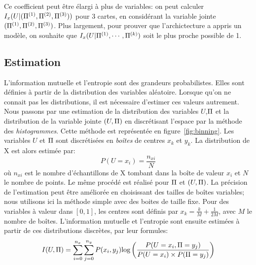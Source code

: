 
Ce coefficient peut être élargi à plus de variables: on peut calculer $I_x(U | (\Pi^{({1})},\Pi^{({2})},\Pi^{({3})}))$ pour 3 cartes, en considérant la variable jointe $(\Pi^{({1})},\Pi^{({2})},\Pi^{({3})})$.
Plus largement, pour prouver que l'archictecture a appris un modèle, on souhaite que $I_x(U|\Pi^{({1})},\cdots,\Pi^{({k})})$ soit le plus proche possible de 1.

\subsection{Estimation}

L'information mutuelle et l'entropie sont des grandeurs probabilistes. Elles sont définies à partir de la distribution des variables aléatoire. Lorsque qu'on ne connait pas les distributions, il est nécessaire d'estimer ces valeurs autrement. 
Nous passons par une estimation de la distribution des variables $U$,$\Pi$ et la distribution de la variable jointe $(U,\Pi)$ en discrétisant l'espace par la méthode des \emph{histogrammes}.
Cette méthode est représentée en figure~\ref{fig:binning}. Les variables $U$ et $\Pi$ sont discrétisées en \emph{boîtes} de centres $x_k$ et $y_k$.
La distribution de X est alors estimée par: 
$$P(U = x_i) = \frac{n_{xi}}{N} $$ où $n_{xi}$ est le nombre d'échantillons de X tombant dans la boîte de valeur $x_i$ et $N$ le nombre de points. Le même procédé est réalisé pour $\Pi$ et $(U,\Pi)$. La précision de l'estimation peut être améliorée en choisissant des tailles de boîtes variables; nous utilisons ici la méthode simple avec des boites de taille fixe. Pour des variables à valeur dans $[0,1]$, les centres sont définis par $x_k = \frac{k}{M}+\frac{1}{2M}$, avec $M$ le nombre de boîtes.
L'information mutuelle et l'entropie sont ensuite estimées à partir de ces distributions discrètes, par leur formules:
\begin{equation}
    I(U,\Pi) = \sum_{i = 0}^{n_x} \sum_{j=0}^{n_y} {P(x_i,y_j)\textrm{log}\left(\frac{P(U = x_i,\Pi = y_j)}{P(U = x_i)\times P(\Pi = y_j)}\right)}
   \end{equation}

